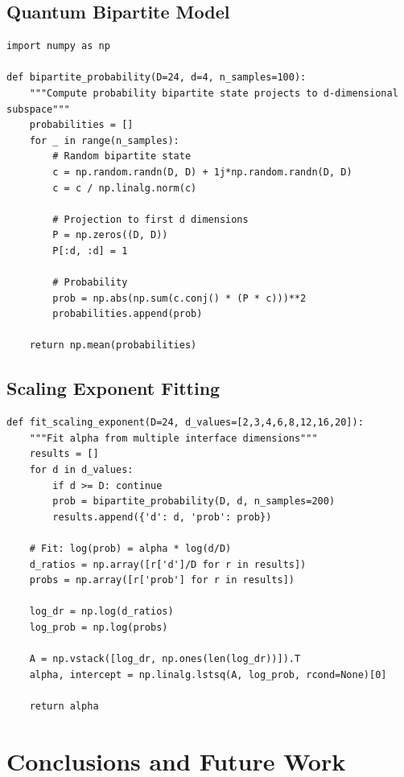 \documentclass[11pt]{article}
\begin{document}
\subsection{Quantum Bipartite Model}

\begin{lstlisting}[caption=Quantum bipartite projection probability]
import numpy as np

def bipartite_probability(D=24, d=4, n_samples=100):
    """Compute probability bipartite state projects to d-dimensional subspace"""
    probabilities = []
    for _ in range(n_samples):
        # Random bipartite state
        c = np.random.randn(D, D) + 1j*np.random.randn(D, D)
        c = c / np.linalg.norm(c)
        
        # Projection to first d dimensions
        P = np.zeros((D, D))
        P[:d, :d] = 1
        
        # Probability
        prob = np.abs(np.sum(c.conj() * (P * c)))**2
        probabilities.append(prob)
    
    return np.mean(probabilities)
\end{lstlisting}

\subsection{Scaling Exponent Fitting}

\begin{lstlisting}[caption=Fitting scaling exponent from multiple dimensions]
def fit_scaling_exponent(D=24, d_values=[2,3,4,6,8,12,16,20]):
    """Fit alpha from multiple interface dimensions"""
    results = []
    for d in d_values:
        if d >= D: continue
        prob = bipartite_probability(D, d, n_samples=200)
        results.append({'d': d, 'prob': prob})
    
    # Fit: log(prob) = alpha * log(d/D)
    d_ratios = np.array([r['d']/D for r in results])
    probs = np.array([r['prob'] for r in results])
    
    log_dr = np.log(d_ratios)
    log_prob = np.log(probs)
    
    A = np.vstack([log_dr, np.ones(len(log_dr))]).T
    alpha, intercept = np.linalg.lstsq(A, log_prob, rcond=None)[0]
    
    return alpha
\end{lstlisting}

\section{Conclusions and Future Work}
\end{document}
